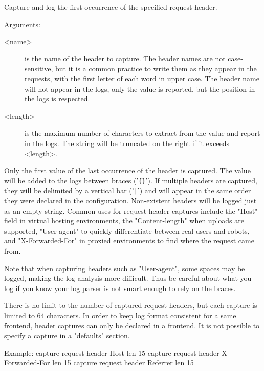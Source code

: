   Capture and log the first occurrence of the specified request header.

  
  Arguments:
  \begin{description}
  \item[<name>]    is the name of the header to capture. The header names are not
              case-sensitive, but it is a common practice to write them as they
              appear in the requests, with the first letter of each word in
              upper case. The header name will not appear in the logs, only the
              value is reported, but the position in the logs is respected.

  \item[<length>]  is the maximum number of characters to extract from the value and
              report in the logs. The string will be truncated on the right if
              it exceeds <length>.
  \end{description}

  Only the first value of the last occurrence of the header is captured. The
  value will be added to the logs between braces ('\verb|{}|'). If multiple headers
  are captured, they will be delimited by a vertical bar ('\verb:|:') and will appear
  in the same order they were declared in the configuration. Non-existent
  headers will be logged just as an empty string. Common uses for request
  header captures include the "Host" field in virtual hosting environments, the
  "Content-length" when uploads are supported, "User-agent" to quickly
  differentiate between real users and robots, and "X-Forwarded-For" in proxied
  environments to find where the request came from.

  Note that when capturing headers such as "User-agent", some spaces may be
  logged, making the log analysis more difficult. Thus be careful about what
  you log if you know your log parser is not smart enough to rely on the
  braces.

  There is no limit to the number of captured request headers, but each capture
  is limited to 64 characters. In order to keep log format consistent for a
  same frontend, header captures can only be declared in a frontend. It is not
  possible to specify a capture in a "defaults" section.

  \begin{example}{Example:}
        capture request header Host len 15
        capture request header X-Forwarded-For len 15
        capture request header Referrer len 15
  \end{example}

